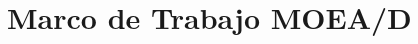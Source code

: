 \documentclass[letterpaper,10pt]{article}
\begin{document}
 

\section{Marco de Trabajo MOEA/D}
% 
% 
% 
% 
% 
\end{document}
